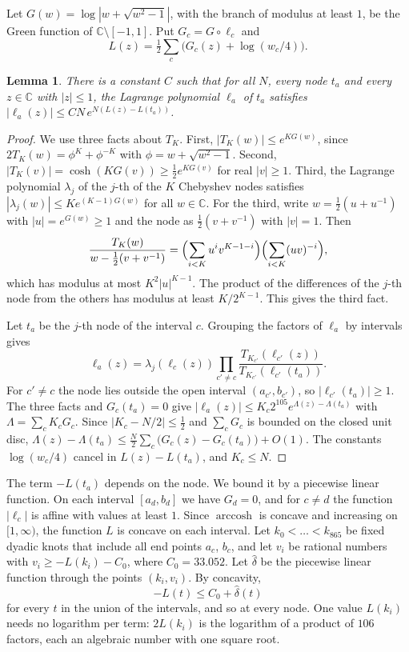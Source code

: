 \documentclass[11pt]{amsart}
\newcommand{\Czero}{33.052}
\newtheorem{lemma}[theorem]{Lemma}
\theoremstyle{definition}
\theoremstyle{remark}
\numberwithin{equation}{section}
\newcommand{\C}{\mathbb C}
\begin{document}
Let $G(w)=\log|w+\sqrt{w^2-1}|$, with the branch of modulus at least $1$, be the Green function of
$\C\setminus[-1,1]$. Put $G_c=G\circ\ell_c$ and
\begin{equation}\label{eq:Ldef}
 L(z)=\tfrac12\sum_c\bigl(G_c(z)+\log(w_c/4)\bigr).
\end{equation}

\begin{lemma}\label{lem:lagrange}
There is a constant $C$ such that for all $N$, every node $t_a$ and every $z\in\C$ with $|z|\le1$, the
Lagrange polynomial $\ell_a$ of $t_a$ satisfies $|\ell_a(z)|\le CN\,e^{N(L(z)-L(t_a))}$.
\end{lemma}

\begin{proof}
We use three facts about $T_K$. First, $|T_K(w)|\le e^{KG(w)}$, since $2T_K(w)=\phi^K+\phi^{-K}$ with
$\phi=w+\sqrt{w^2-1}$. Second, $|T_K(v)|=\cosh(KG(v))\ge\frac12e^{KG(v)}$ for real $|v|\ge1$. Third, the
Lagrange polynomial $\lambda_j$ of the $j$-th of the $K$ Chebyshev nodes satisfies
$|\lambda_j(w)|\le Ke^{(K-1)G(w)}$ for all $w\in\C$. For the third, write $w=\frac12(u+u^{-1})$ with
$|u|=e^{G(w)}\ge1$ and the node as $\frac12(v+v^{-1})$ with $|v|=1$. Then
\[
 \frac{T_K(w)}{w-\frac12(v+v^{-1})}=\Bigl(\sum_{i<K}u^iv^{K-1-i}\Bigr)\Bigl(\sum_{i<K}(uv)^{-i}\Bigr),
\]
which has modulus at most $K^2|u|^{K-1}$. The product of the differences of the $j$-th node from the others
has modulus at least $K/2^{K-1}$. This gives the third fact.

Let $t_a$ be the $j$-th node of the interval $c$. Grouping the factors of $\ell_a$ by intervals gives
\[
 \ell_a(z)=\lambda_j(\ell_c(z))\prod_{c'\ne c}\frac{T_{K_{c'}}(\ell_{c'}(z))}{T_{K_{c'}}(\ell_{c'}(t_a))}.
\]
For $c'\ne c$ the node lies outside the open interval $(a_{c'},b_{c'})$, so $|\ell_{c'}(t_a)|\ge1$. The
three facts and $G_c(t_a)=0$ give $|\ell_a(z)|\le K_c2^{105}e^{\Lambda(z)-\Lambda(t_a)}$ with
$\Lambda=\sum_cK_cG_c$. Since $|K_c-N/2|\le\frac12$ and $\sum_cG_c$ is bounded on the closed unit disc,
$\Lambda(z)-\Lambda(t_a)\le\frac N2\sum_c\bigl(G_c(z)-G_c(t_a)\bigr)+O(1)$. The constants $\log(w_c/4)$ cancel
in $L(z)-L(t_a)$, and $K_c\le N$.
\end{proof}

The term $-L(t_a)$ depends on the node. We bound it by a piecewise linear function. On each interval
$[a_d,b_d]$ we have $G_d=0$, and for $c\ne d$ the function $|\ell_c|$ is affine with values at least $1$.
Since $\operatorname{arccosh}$ is concave and increasing on $[1,\infty)$, the function $L$ is concave on each
interval. Let $k_0<\dots<k_{865}$ be fixed dyadic knots that include all end points $a_c$, $b_c$, and let
$v_i$ be rational numbers with $v_i\ge-L(k_i)-C_0$, where $C_0=\Czero$. Let $\hat\delta$ be the piecewise
linear function through the points $(k_i,v_i)$. By concavity,
\begin{equation}\label{eq:chord}
 -L(t)\le C_0+\hat\delta(t)
\end{equation}
for every $t$ in the union of the intervals, and so at every node. One value $L(k_i)$ needs no
logarithm per term: $2L(k_i)$ is the logarithm of a product of $106$ factors, each an algebraic number with
one square root.
\end{document}
